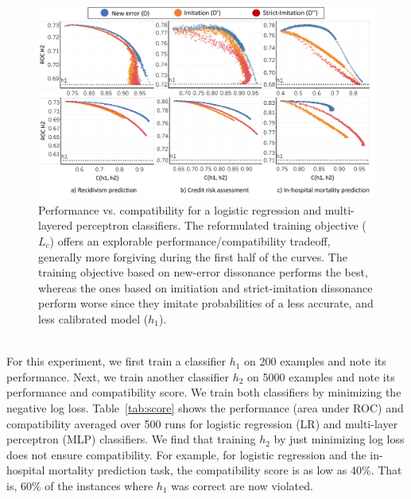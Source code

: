 \documentclass[letterpaper]{article}
\newcommand{\hone}{\mbox{$h_1$}}
\newcommand{\htwo}{\mbox{$h_2$}}
\newcommand{\loss}{L}
\newcommand{\lossbc}{\loss_c}
\begin{document}
\begin{figure}[t]
    \centering
    \includegraphics[width=0.9\linewidth]{figure5.pdf}
    \caption{Performance vs. compatibility for a logistic regression and multi-layered perceptron classifiers. The reformulated training objective ($\lossbc$) offers an explorable performance/compatibility tradeoff, generally more forgiving during the first half of the curves. The training objective based on new-error dissonance performs the best, whereas the ones based on imitiation and strict-imitation dissonance perform worse since they imitate probabilities of a less accurate, and less calibrated model ($\hone$).}
    \label{fig:diss}
\end{figure}
\\
\noindent For this experiment, we first train a classifier $\hone$ on 200 examples and note its performance. Next, we train another classifier $\htwo$ on 5000 examples
and note its performance and compatibility score. We train both classifiers by minimizing the negative log loss. Table~\ref{tab:score} shows the performance (area under ROC) and compatibility averaged over 500 runs for logistic regression (LR) and multi-layer perceptron (MLP) classifiers. We find that training $\htwo$ by just minimizing log loss does not ensure compatibility. For example, for logistic regression and the in-hospital mortality prediction task, the compatibility score is as low as 40\%.  That is, 60\% of the instances where $h_1$ was correct are now violated.\\
\end{document}
